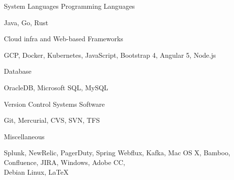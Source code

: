 \begin{cventries}
  \cventry
    {System Languages}
    {Programming Languages}
    { }
    { }
    {
      \begin{cvitems}
        \item {Java, Go, Rust}
      \end{cvitems}
    }
  \cventry
    {Cloud infra and Web-based Frameworks}
    { }
    { }
    { }
    {
      \begin{cvitems}
        \item {GCP, Docker, Kubernetes, JavaScript, Bootstrap 4, Angular 5, Node.js}
      \end{cvitems}
    }
  \cventry
    {Database}
    { }
    { }
    { }
    {
      \begin{cvitems}
        \item {OracleDB, Microsoft SQL, MySQL}
      \end{cvitems}
    }
  \cventry
    {Version Control Systems}
    {Software}
    { }
    { }
    {
      \begin{cvitems}
        \item {Git, Mercurial, CVS, SVN, TFS}
      \end{cvitems}
    }
  \cventry
    {Miscellaneous}
    { }
    { }
    { }
    {
      \begin{cvitems}
        \item {Splunk, NewRelic, PagerDuty, Spring Webflux, Kafka, Mac OS X, Bamboo, Confluence, JIRA, Windows, Adobe CC, \\ Debian Linux, LaTeX}
      \end{cvitems}
    }
\end{cventries}